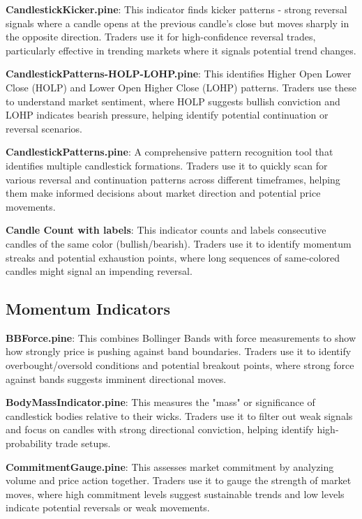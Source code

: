 \documentclass[12pt]{article}
\begin{document}
\textbf{CandlestickKicker.pine}: This indicator finds kicker patterns - strong reversal signals where a candle opens at the previous candle's close but moves sharply in the opposite direction. Traders use it for high-confidence reversal trades, particularly effective in trending markets where it signals potential trend changes.

\textbf{CandlestickPatterns-HOLP-LOHP.pine}: This identifies Higher Open Lower Close (HOLP) and Lower Open Higher Close (LOHP) patterns. Traders use these to understand market sentiment, where HOLP suggests bullish conviction and LOHP indicates bearish pressure, helping identify potential continuation or reversal scenarios.

\textbf{CandlestickPatterns.pine}: A comprehensive pattern recognition tool that identifies multiple candlestick formations. Traders use it to quickly scan for various reversal and continuation patterns across different timeframes, helping them make informed decisions about market direction and potential price movements.

\textbf{Candle Count with labels}: This indicator counts and labels consecutive candles of the same color (bullish/bearish). Traders use it to identify momentum streaks and potential exhaustion points, where long sequences of same-colored candles might signal an impending reversal.

\subsection{Momentum Indicators}

\textbf{BBForce.pine}: This combines Bollinger Bands with force measurements to show how strongly price is pushing against band boundaries. Traders use it to identify overbought/oversold conditions and potential breakout points, where strong force against bands suggests imminent directional moves.

\textbf{BodyMassIndicator.pine}: This measures the "mass" or significance of candlestick bodies relative to their wicks. Traders use it to filter out weak signals and focus on candles with strong directional conviction, helping identify high-probability trade setups.

\textbf{CommitmentGauge.pine}: This assesses market commitment by analyzing volume and price action together. Traders use it to gauge the strength of market moves, where high commitment levels suggest sustainable trends and low levels indicate potential reversals or weak movements.
\end{document}
